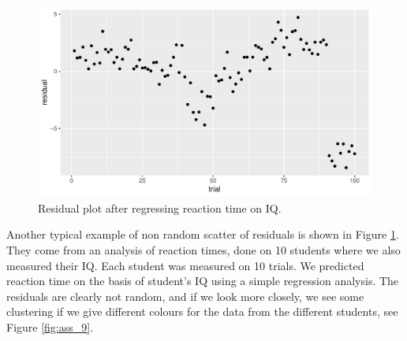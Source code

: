 \documentclass[]{report}\usepackage[]{graphicx}\usepackage[]{color}
\makeatletter
\def\maxwidth{ %
  \ifdim\Gin@nat@width>\linewidth
    \linewidth
  \else
    \Gin@nat@width
  \fi
}
\newenvironment{knitrout}{}{} %
\makeatother
\begin{document}
\begin{knitrout}
\color{fgcolor}\begin{figure}

{\centering \includegraphics[width=\maxwidth]{figure/ass_8-1} 

}

\caption[Residual plot after regressing reaction time on IQ]{Residual plot after regressing reaction time on IQ.}\label{fig:ass_8}
\end{figure}


\end{knitrout}

Another typical example of non random scatter of residuals is shown in Figure \ref{fig:ass_8}. They come from an analysis of reaction times, done on 10 students where we also measured their IQ. Each student was measured on 10 trials. We predicted reaction time on the basis of student's IQ using a simple regression analysis. The residuals are clearly not random, and if we look more closely, we see some clustering if we give different colours for the data from the different students, see Figure \ref{fig:ass_9}.
\end{document}
